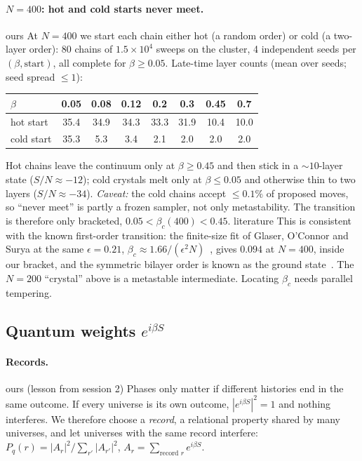 \documentclass[11pt,a4paper]{article}
\newcommand{\tagbox}[2]{\textsf{\scriptsize\colorbox{#1!12}{\textcolor{#1!70!black}{#2}}}}
\newcommand{\lit}{\tagbox{blue}{literature}}
\newcommand{\ours}{\tagbox{orange}{ours}}
\begin{document}
\paragraph{$N=400$: hot and cold starts never meet.} \ours{} At $N=400$ we start each chain either hot (a random order) or cold (a two-layer order): 80 chains of $1.5\times10^4$ sweeps on the cluster, 4 independent seeds per $(\beta,\text{start})$, all complete for $\beta\ge0.05$. Late-time layer counts (mean over seeds; seed spread $\le1$):
\begin{center}\small
\begin{tabular}{@{}lccccccc@{}}
\toprule
$\beta$ & 0.05 & 0.08 & 0.12 & 0.2 & 0.3 & 0.45 & 0.7\\
\midrule
hot start & 35.4 & 34.9 & 34.3 & 33.3 & 31.9 & 10.4 & 10.0\\
cold start & 35.3 & 5.3 & 3.4 & 2.1 & 2.0 & 2.0 & 2.0\\
\bottomrule
\end{tabular}
\end{center}
Hot chains leave the continuum only at $\beta\ge0.45$ and then stick in a $\sim10$-layer state ($S/N\approx-12$); cold crystals melt only at $\beta\le0.05$ and otherwise thin to two layers ($S/N\approx-34$). \emph{Caveat:} the cold chains accept $\le0.1\%$ of proposed moves, so ``never meet'' is partly a frozen sampler, not only metastability. The transition is therefore only bracketed, $0.05<\beta_c(400)<0.45$. \lit{} This is consistent with the known first-order transition: the finite-size fit of Glaser, O'Connor and Surya at the same $\epsilon=0.21$, $\beta_c\approx1.66/(\epsilon^2N)$~\cite{GOS18}, gives $0.094$ at $N=400$, inside our bracket, and the symmetric bilayer order is known as the ground state~\cite{CunninghamSurya19}. The $N=200$ ``crystal'' above is a metastable intermediate. Locating $\beta_c$ needs parallel tempering.

\subsection{Quantum weights $e^{i\beta S}$}
\paragraph{Records.} \ours{} (lesson from session 2) Phases only matter if different histories end in the same outcome. If every universe is its own outcome, $|e^{i\beta S}|^2=1$ and nothing interferes. We therefore choose a \emph{record}, a relational property shared by many universes, and let universes with the same record interfere: $P_q(r)=|A_r|^2/\sum_{r'}|A_{r'}|^2$, $A_r=\sum_{\text{record }r}e^{i\beta S}$.
\end{document}
